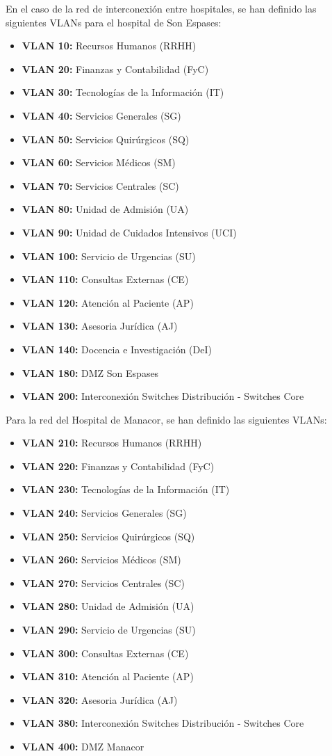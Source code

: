 En el caso de la red de interconexión entre hospitales, se han definido las siguientes VLANs para el hospital de Son Espases:
\begin{itemize}
    \item \textbf{VLAN 10:} Recursos Humanos (RRHH)
    \item \textbf{VLAN 20:} Finanzas y Contabilidad (FyC)
    \item \textbf{VLAN 30:} Tecnologías de la Información (IT)
    \item \textbf{VLAN 40:} Servicios Generales (SG)
    \item \textbf{VLAN 50:} Servicios Quirúrgicos (SQ)
    \item \textbf{VLAN 60:} Servicios Médicos (SM)
    \item \textbf{VLAN 70:} Servicios Centrales (SC)
    \item \textbf{VLAN 80:} Unidad de Admisión (UA)
    \item \textbf{VLAN 90:} Unidad de Cuidados Intensivos (UCI)
    \item \textbf{VLAN 100:} Servicio de Urgencias (SU)
    \item \textbf{VLAN 110:} Consultas Externas (CE)
    \item \textbf{VLAN 120:} Atención al Paciente (AP)
    \item \textbf{VLAN 130:} Asesoria Jurídica (AJ)
    \item \textbf{VLAN 140:} Docencia e Investigación (DeI)
    \item \textbf{VLAN 180:} DMZ Son Espases
    \item \textbf{VLAN 200:} Interconexión Switches Distribución - Switches Core
\end{itemize}

Para la red del Hospital de Manacor, se han definido las siguientes VLANs:
\begin{itemize}
    \item \textbf{VLAN 210:} Recursos Humanos (RRHH)
    \item \textbf{VLAN 220:} Finanzas y Contabilidad (FyC)
    \item \textbf{VLAN 230:} Tecnologías de la Información (IT)
    \item \textbf{VLAN 240:} Servicios Generales (SG)
    \item \textbf{VLAN 250:} Servicios Quirúrgicos (SQ)
    \item \textbf{VLAN 260:} Servicios Médicos (SM)
    \item \textbf{VLAN 270:} Servicios Centrales (SC)
    \item \textbf{VLAN 280:} Unidad de Admisión (UA)
    \item \textbf{VLAN 290:} Servicio de Urgencias (SU)
    \item \textbf{VLAN 300:} Consultas Externas (CE)
    \item \textbf{VLAN 310:} Atención al Paciente (AP)
    \item \textbf{VLAN 320:} Asesoria Jurídica (AJ)
    \item \textbf{VLAN 380:} Interconexión Switches Distribución - Switches Core
    \item \textbf{VLAN 400:} DMZ Manacor
\end{itemize}

